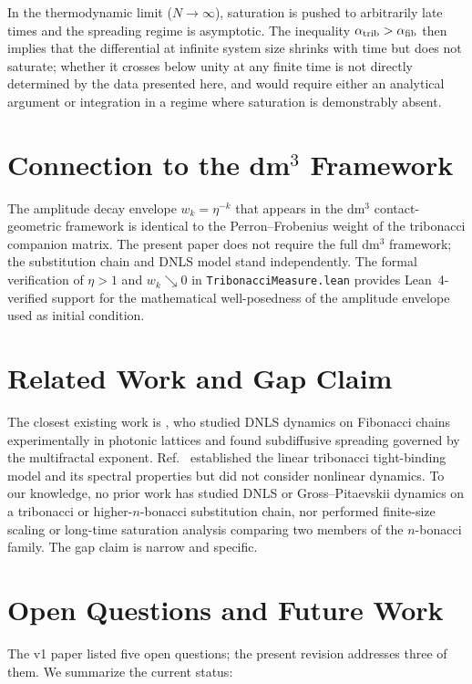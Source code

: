 \documentclass[12pt,a4paper]{article}
\begin{document}
In the thermodynamic limit ($N \to \infty$), saturation is pushed to
arbitrarily late times and the spreading regime is asymptotic. The
inequality $\alpha_{\rm trib} > \alpha_{\rm fib}$ then implies that the
differential at infinite system size shrinks with time but does not
saturate; whether it crosses below unity at any finite time is not
directly determined by the data presented here, and would require either
an analytical argument or integration in a regime where saturation is
demonstrably absent.

\section{Connection to the dm$^3$ Framework}

The amplitude decay envelope $w_k = \eta^{-k}$ that appears in the dm$^3$
contact-geometric framework \cite{Grossi2026_Vol1,Grossi2026_Wavenumber6}
is identical to the Perron--Frobenius weight of the tribonacci companion
matrix. The present paper does not require the full dm$^3$ framework; the
substitution chain and DNLS model stand independently. The formal
verification of $\eta > 1$ and $w_k \searrow 0$ in
\texttt{TribonacciMeasure.lean} \cite{AXLE2026} provides Lean~4-verified
support for the mathematical well-posedness of the amplitude envelope used
as initial condition.

\section{Related Work and Gap Claim}

The closest existing work is \cite{Lahini2009}, who studied DNLS dynamics
on Fibonacci chains experimentally in photonic lattices and found
subdiffusive spreading governed by the multifractal exponent.
Ref.~\cite{Krebbekx2023} established the linear tribonacci tight-binding
model and its spectral properties but did not consider nonlinear dynamics.
To our knowledge, no prior work has studied DNLS or Gross--Pitaevskii
dynamics on a tribonacci or higher-$n$-bonacci substitution chain, nor
performed finite-size scaling or long-time saturation analysis comparing
two members of the $n$-bonacci family. The gap claim is narrow and
specific.

\section{Open Questions and Future Work}

The v1 paper listed five open questions; the present revision addresses
three of them. We summarize the current status:
\end{document}
